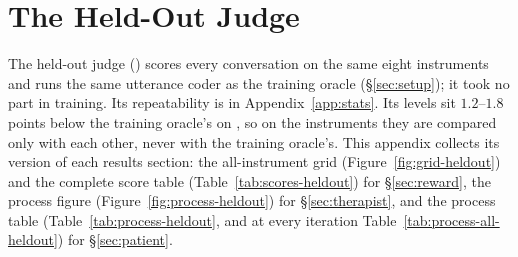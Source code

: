 \section{The Held-Out Judge}
\label{app:heldout}

The held-out judge (\heldoutjudge) scores every conversation on the same eight instruments and
runs the same utterance coder as the training oracle (\S\ref{sec:setup}); it took no part in
training. Its repeatability is in Appendix~\ref{app:stats}. Its levels sit $1.2$--$1.8$ points
below the training oracle's on \QQ, so on the instruments they are compared only with each other,
never with the training oracle's. This appendix collects its version of each
results section: the all-instrument grid (Figure~\ref{fig:grid-heldout}) and the complete score
table (Table~\ref{tab:scores-heldout}) for \S\ref{sec:reward}, the process figure
(Figure~\ref{fig:process-heldout}) for \S\ref{sec:therapist}, and the process table
(Table~\ref{tab:process-heldout}, and at every iteration Table~\ref{tab:process-all-heldout}) for
\S\ref{sec:patient}.

